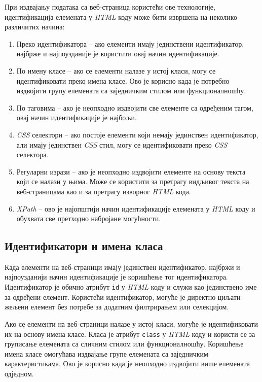 \documentclass[12pt,oneside]{memoir}
\begin{document}
При издвајању података са веб-страница користећи ове технологије, идентификација елемената у \textit{HTML} коду може бити извршена на неколико различитих начина:
\begin{enumerate}
\item Преко идентификатора -- ако елементи имају јединствени идентификатор, најбрже и најпоузданије је користити овај начин идентификације.
\item По имену класе -- ако се елементи налазе у истој класи, могу се идентификовати преко имена класе. Ово је корисно када је потребно издвојити групу елемената са заједничким стилом или функционалношћу.
\item По таговима -- ако је неопходно издвојити све елементе са одређеним тагом, овај начин идентификације је најбољи.
\item \textit{CSS} селектори -- ако постоје елементи који немају јединствен идентификатор, али имају јединствен \textit{CSS} стил, могу се идентификовати преко \textit{CSS} селектора.
\item Регуларни изрази -- ако је неопходно издвојити елементе на основу текста који се налази у њима. Може се користити за претрагу видљивог текста на веб-страницама као и за претрагу изворног \textit{HTML} кода.
\item \textit{XPath} -- ово је најопштији начин идентификације елемената у \textit{HTML} коду и обухвата све претходно набројане могућности.
\end{enumerate}

\subsection{Идентификатори и имена класа}
Када елементи на веб-страници имају јединствен идентификатор, најбржи и најпоузданији начин идентификације је коришћење тог идентификатора. Идентификатор је обично атрибут \texttt{id} у \textit{HTML} коду и служи као јединствено име за одређени елемент. Користећи идентификатор, могуће је директно циљати жељени елемент без потребе за додатним филтрирањем или селекцијом.

Ако се елементи на веб-страници налазе у истој класи, могуће је идентификовати их на основу имена класе. Класа је атрибут \texttt{class} у \textit{HTML} коду и користи се за груписање елемената са сличним стилом или функционалношћу. Коришћење имена класе омогућава издвајање групе елемената са заједничким карактеристикама. Ово је корисно када је неопходно издвојити више елемената одједном.
\end{document}
